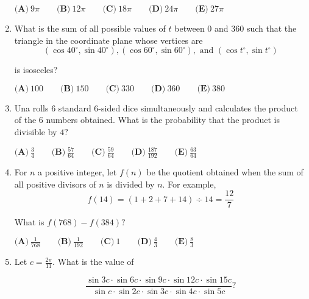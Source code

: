 \documentclass{article}
\begin{document}
\begin{enumerate}[label=\arabic*., itemsep=0.5em]
\(\textbf{(A)} \: 9\pi \qquad\textbf{(B)} \: 12\pi \qquad\textbf{(C)} \: 18\pi \qquad\textbf{(D)} \: 24\pi \qquad\textbf{(E)} \: 27\pi\)\par \vspace{0.5em}\item What is the sum of all possible values of \(t\) between \(0\) and \(360\) such that the triangle in the coordinate plane whose vertices are 
\begin{equation*}
(\cos 40^\circ,\sin 40^\circ), (\cos 60^\circ,\sin 60^\circ), \text{ and } (\cos t^\circ,\sin t^\circ)
\end{equation*}

is isosceles? 

\(\textbf{(A)} \: 100 \qquad\textbf{(B)} \: 150 \qquad\textbf{(C)} \: 330 \qquad\textbf{(D)} \: 360 \qquad\textbf{(E)} \: 380\)\par \vspace{0.5em}\item Una rolls \(6\) standard \(6\)-sided dice simultaneously and calculates the product of the \(6{ }\) numbers obtained. What is the probability that the product is divisible by \(4?\)

\(\textbf{(A)}\: \frac34\qquad\textbf{(B)} \: \frac{57}{64}\qquad\textbf{(C)} \: \frac{59}{64}\qquad\textbf{(D)} \: \frac{187}{192}\qquad\textbf{(E)} \: \frac{63}{64}\)\par \vspace{0.5em}\item For \(n\) a positive integer, let \(f(n)\) be the quotient obtained when the sum of all positive divisors of \(n\) is divided by \(n.\) For example, 
\begin{equation*}
f(14)=(1+2+7+14)\div 14=\frac{12}{7}
\end{equation*}

What is \(f(768)-f(384)?\)

\(\textbf{(A)}\ \frac{1}{768} \qquad\textbf{(B)}\ \frac{1}{192} \qquad\textbf{(C)}\ 1 \qquad\textbf{(D)}\
\frac{4}{3} \qquad\textbf{(E)}\ \frac{8}{3}\)\par \vspace{0.5em}\item Let \(c = \frac{2\pi}{11}.\) What is the value of

\begin{equation*}
\frac{\sin 3c \cdot \sin 6c \cdot \sin 9c \cdot \sin 12c \cdot \sin 15c}{\sin c \cdot \sin 2c \cdot \sin 3c \cdot \sin 4c \cdot \sin 5c}?
\end{equation*}



\end{enumerate}
\end{document}
